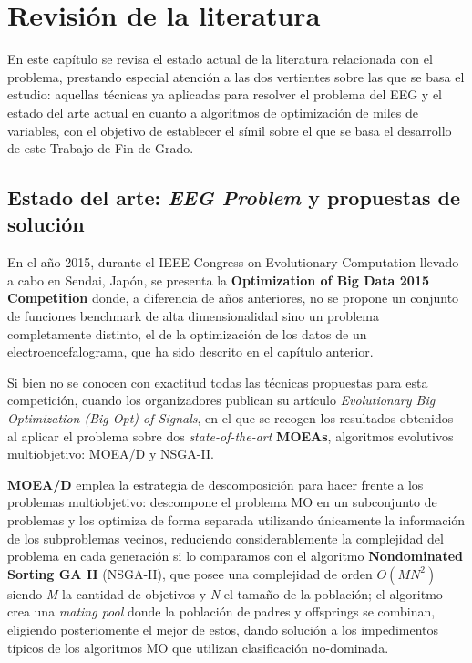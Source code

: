 \chapter{Revisión de la literatura}

En este capítulo se revisa el estado actual de la literatura relacionada con el problema, prestando especial atención a las dos vertientes sobre las que se basa el estudio: aquellas técnicas ya aplicadas para resolver el problema del EEG y el estado del arte actual en cuanto a algoritmos de optimización de miles de variables, con el objetivo de establecer el símil sobre el que se basa el desarrollo de este Trabajo de Fin de Grado. 

\section{Estado del arte: \textit{EEG Problem} y propuestas de solución}

En el año 2015, durante el IEEE Congress on Evolutionary Computation llevado a cabo en Sendai, Japón\cite{IEEE-CEC2015}, se presenta la  \textbf{Optimization of Big Data 2015 Competition}\cite{CompetitionBigOpt} donde, a diferencia de años anteriores, no se propone un conjunto de funciones benchmark de alta dimensionalidad sino un problema completamente distinto, el de la optimización de los datos de un electroencefalograma, que ha sido descrito en el capítulo anterior.

Si bien no se conocen con exactitud todas las técnicas propuestas para esta competición, cuando los organizadores publican su artículo \textit{Evolutionary Big Optimization (Big Opt) of Signals}\cite{EvolutionaryBigOpt}, en el que se recogen los resultados obtenidos al aplicar el problema sobre dos \textit{state-of-the-art} \textbf{MOEAs}, algoritmos evolutivos multiobjetivo: MOEA/D y NSGA-II.

\textbf{MOEA/D}\cite{MOEA/D} emplea la estrategia de descomposición para hacer frente a los problemas multiobjetivo: descompone el problema MO en un subconjunto de problemas y los optimiza de forma separada utilizando únicamente la información de los subproblemas vecinos, reduciendo considerablemente la complejidad del problema en cada generación si lo comparamos con el algoritmo \textbf{Nondominated Sorting GA II} (NSGA-II)\cite{NSGA-II}, que posee una complejidad de orden $O(MN^2)$ siendo \textit{M} la cantidad de objetivos y \textit{N} el tamaño de la población; el algoritmo crea una \textit{mating pool} donde la población de padres y offsprings se combinan, eligiendo posteriomente el mejor de estos, dando solución a los impedimentos típicos de los algoritmos MO que utilizan clasificación no-dominada.


